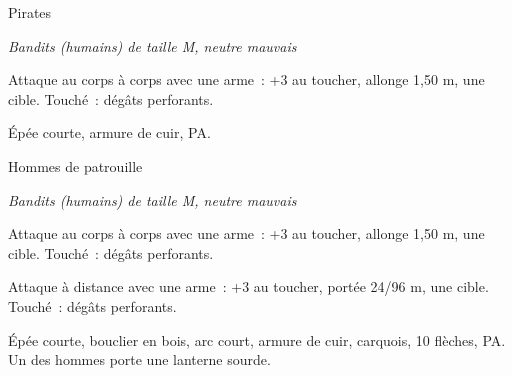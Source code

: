 \documentclass[a4paper,10pt,openany]{book}
\begin{document}
\begin{multicols}{2}
\begin{monsterbox}{Pirates}
	\begin{hangingpar}
		\textit{Bandits (humains) de taille M, neutre mauvais}
	\end{hangingpar}
	\dndline%
	\basics[%
	armorclass = 12 (armure de cuir),
	hitpoints  = \dice{2d8 + 2},
	speed      = 9 m
	]
	\dndline%
	\stats[
	DEX = \stat{12},
	CON = \stat{12} 
	]
	\dndline%
	\details[%
	skills= Acrobatie +3,
	senses= Perception passive 10,
	languages = bas-thrain,
	challenge= 1/8
	]
	\dndline%
	\begin{monsteraction}
		Attaque au corps à corps avec une arme : +3 au toucher, allonge 1,50 m, une cible. Touché :  dégâts perforants.
	\end{monsteraction}
	\dndline%
	\begin{monsteraction}[Possessions]
		Épée courte, armure de cuir,  PA.
	\end{monsteraction}
\end{monsterbox}

\begin{monsterbox}{Hommes de patrouille}
	\begin{hangingpar}
		\textit{Bandits (humains) de taille M, neutre mauvais}
	\end{hangingpar}
	\dndline%
	\basics[%
	armorclass = 14 (armure de cuir et bouclier),
	hitpoints  = \dice{2d8 + 2},
	speed      = 9 m
	]
	\dndline%
	\stats[
	DEX = \stat{12},
	CON = \stat{12} 
	]
	\dndline%
	\details[%
	senses= Perception passive 10,
	languages = bas-thrain,
	challenge= 1/8
	]
	\dndline%
	\begin{monsteraction}
		Attaque au corps à corps avec une arme : +3 au toucher, allonge 1,50 m, une cible. Touché :  dégâts perforants.
	\end{monsteraction}
	\begin{monsteraction}
		Attaque à distance avec une arme : +3 au toucher, portée 24/96 m, une cible. Touché :  dégâts perforants.
	\end{monsteraction}
	\dndline%
	\begin{monsteraction}[Possessions]
		Épée courte, bouclier en bois, arc court, armure de cuir, carquois, 10 flèches,  PA. Un des hommes porte une lanterne sourde.
	\end{monsteraction}
\end{monsterbox}


\end{multicols}
\end{document}

